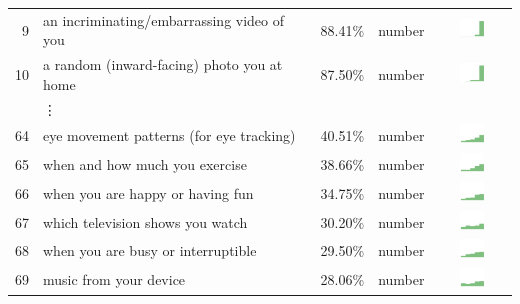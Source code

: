 \begin{table}[t]
\begin{center}
\begin{tabular}{| r | l | r | l |c |}
9 & an incriminating/embarrassing video of you & 88.41\% & number & \includegraphics[width = 2cm, height = 0.5cm]{tex-inputs/data10/tookanincriminatingvideoofyoudoingsomethingembarrassingcombined}\\
10 & a random (inward-facing) photo you at home & 87.50\% & number & \includegraphics[width = 2cm, height = 0.5cm]{tex-inputs/data10/tookphotosofyou(withaninward-facingcamera)athomecombined}\\
 & \vdots & \\
64 & eye movement patterns (for eye tracking) & 40.51\%& number & \includegraphics[width = 2cm, height = 0.5cm]{tex-inputs/data10/scannedyoureyetolearnyoureyepatterns(foreyetracking)combined} \\
65 & when and how much you exercise  & 38.66\% & number & \includegraphics[width = 2cm, height = 0.5cm]{tex-inputs/data10/learnedwhenhowandhowmuchyouexercisecombined}\\
66 & when you are happy or having fun  & 34.75\% & number & \includegraphics[width = 2cm, height = 0.5cm]{tex-inputs/data10/learnedwhenyouwerehappyorhavingfuncombined}\\
67 & which television shows you watch & 30.20\% & number & \includegraphics[width = 2cm, height = 0.5cm]{tex-inputs/data10/learnedwhattelevisionshowsyouwatchcombined}\\
68 & when you are busy or interruptible  & 29.50\% & number & \includegraphics[width = 2cm, height = 0.5cm]{tex-inputs/data10/learnedwhenyouarebusyorinterruptiblecombined}\\
69 & music from your device  & 28.06\% & number & \includegraphics[width = 2cm, height = 0.5cm]{tex-inputs/data10/copiedanduploadedmusicfromyourdevicecombined}\\

\end{tabular}
\end{center}
\end{table}
